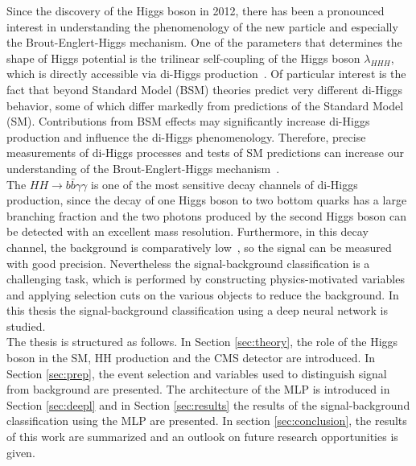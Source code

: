 \label{sec:introduction}

Since the discovery of the Higgs boson in 2012, there has been a pronounced interest in understanding the
phenomenology of the new particle and especially the Brout-Englert-Higgs mechanism. One of the parameters
that determines the shape of Higgs potential is the trilinear self-coupling of the Higgs boson $\lambda_{HHH}$,
which is directly accessible via di-Higgs production~\cite{CMS:2021qbp, HandbookLHC}. Of particular interest is the fact that beyond Standard Model (BSM) theories
predict very different di-Higgs behavior, some of which differ markedly from predictions of the Standard Model (SM).
Contributions from BSM effects may significantly increase di-Higgs production and influence the di-Higgs phenomenology. Therefore, precise
measurements of di-Higgs processes and tests of SM predictions can increase our understanding of the Brout-Englert-Higgs mechanism~\cite{HandbookLHC}. \\

The $HH \rightarrow b \bar{b} \gamma \gamma$ is one of the most sensitive decay channels of di-Higgs production, since the decay of one Higgs boson
to two bottom quarks has a large branching fraction and the two photons produced by the second Higgs boson can be detected with an excellent mass resolution.
Furthermore, in this decay channel, the background is comparatively low~\cite{CMS:2021qbp}, so the signal can be measured with good precision.
Nevertheless the signal-background classification
is a challenging task, which is performed by constructing physics-motivated variables and applying selection cuts on the various objects to reduce the background.
In this thesis the signal-background classification using a deep neural network is studied. \\

The thesis is structured as follows. In Section \ref{sec:theory}, the role of the Higgs boson in the SM, HH production
and the CMS detector are introduced. In Section \ref{sec:prep}, the event selection and variables used to distinguish signal from background are presented.
The architecture of the MLP is introduced in Section \ref{sec:deepl} and in Section \ref{sec:results} the results of the signal-background classification using the MLP are presented.
In section \ref{sec:conclusion}, the results of this work are summarized and an outlook on future research opportunities is given.